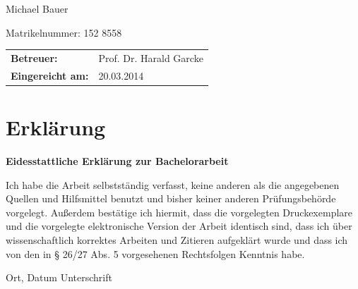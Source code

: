 \begin{center}
\begin{large}
Michael Bauer
\end{large}

\begin{small}
Matrikelnummer: 152 8558
\end{small}

\vspace{1cm}
\begin{tabular}{ll}
{\bf Betreuer:} &Prof. Dr. Harald Garcke\\
{\bf Eingereicht am:} &20.03.2014\\
\end{tabular}

\end{center}
\clearpage

\chapter*{Erklärung}

\textbf{Eidesstattliche Erklärung zur Bachelorarbeit}

Ich habe die Arbeit selbstständig verfasst, keine anderen als die angegebenen Quellen und Hilfsmittel benutzt und bisher keiner anderen Prüfungsbehörde vorgelegt. Außerdem bestätige ich hiermit, dass die vorgelegten Druckexemplare und die vorgelegte elektronische Version der Arbeit identisch sind, dass ich über wissenschaftlich korrektes Arbeiten und Zitieren aufgeklärt wurde und dass ich von den in § 26/27 Abs. 5 vorgesehenen Rechtsfolgen Kenntnis habe.

\vspace{3cm}
Ort, Datum \hspace{5cm} Unterschrift\\


\pagestyle{useheadings} %

\tableofcontents
\listoffigures
\listoftables





